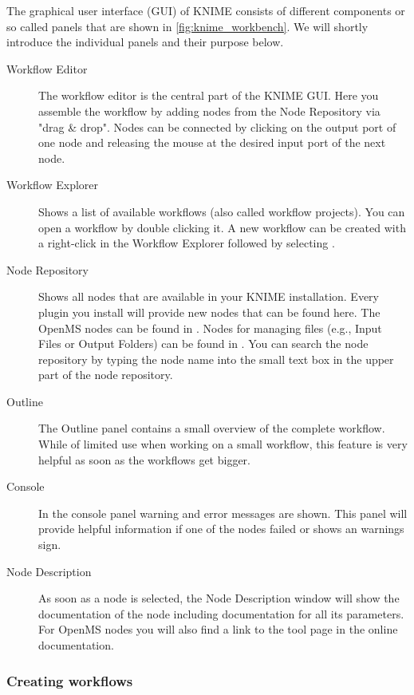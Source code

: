 The graphical user interface (GUI) of KNIME consists of different components or so called panels that are shown in \cref{fig:knime_workbench}.
We will shortly introduce the individual panels and their purpose below.

\begin{description}
\item[Workflow Editor]
The workflow editor is the central part of the KNIME GUI.
Here you assemble the workflow by adding nodes from the Node Repository via "drag \& drop".
Nodes can be connected by clicking on the output port of one node and releasing the mouse at the desired input port of the next node.

\item[Workflow Explorer]
Shows a list of available workflows (also called workflow projects).
You can open a workflow by double clicking it.
A new workflow can be created with a right-click in the Workflow Explorer followed by selecting .

\item[Node Repository]
Shows all nodes that are available in your KNIME installation.
Every plugin you install will provide new nodes that can be found here.
The OpenMS nodes can be found in .
Nodes for managing files (e.g., Input Files or Output Folders) can be found in .
You can search the node repository by typing the node name into the small text box in the upper part of the node repository.

\item[Outline]
The Outline panel contains a small overview of the complete workflow. While of limited use when working on a small workflow, this feature is very helpful as soon as the workflows get bigger.

\item[Console]
In the console panel warning and error messages are shown.
This panel will provide helpful information if one of the nodes failed or shows an warnings sign.

\item[Node Description]
As soon as a node is selected, the Node Description window will show the documentation of the node including documentation for all its parameters.
For OpenMS nodes you will also find a link to the tool page in the online documentation.

\end{description}

\subsubsection{Creating workflows}
\label{sec:create_workflows}

